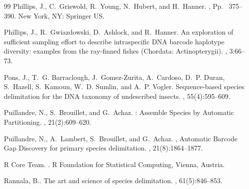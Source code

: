 \documentclass[12pt]{article}
\begin{document}
\begin{thebibliography}{99}
Phillips, J., C.~Griswold, R.~Young, N.~Hubert, and
  H.~Hanner\leavevmode\nopagebreak{}.
, Pp.~ 375--390.
\newblock New York, NY: Springer US.

Phillips, J., R.~Gwiazdowski, D.~Ashlock, and
  R.~Hanner\leavevmode\nopagebreak{}.
\newblock An exploration of sufficient sampling effort to describe
  intraspecific {DNA} barcode haplotype diversity: examples from the ray-finned
  fishes ({C}hordata: {A}ctinopterygii).
, 3:66--73.

Pons, J., T.~G. Barraclough, J.~Gomez-Zurita, A.~Cardoso, D.~P. Duran,
  S.~Hazell, S.~Kamoun, W.~D. Sumlin, and A.~P.
  Vogler\leavevmode\nopagebreak{}.
\newblock Sequence-based species delimitation for the {DNA} taxonomy of
  undescribed insects.
, 55(4):595--609.

Puillandre, N., S.~Brouillet, and G.~Achaz\leavevmode\nopagebreak{}.
: {A}ssemble {S}pecies by {A}utomatic {P}artitioning.
, 21(2):609--620.

Puillandre, N., A.~Lambert, S.~Brouillet, and
  G.~Achaz\leavevmode\nopagebreak{}.
, {A}utomatic {B}arcode {G}ap {D}iscovery for primary species
  delimitation.
, 21(8):1864--1877.

{R Core Team}\leavevmode\nopagebreak{}.
.
\newblock R Foundation for Statistical Computing, Vienna, Austria.

Rannala, B.\leavevmode\nopagebreak{}.
\newblock The art and science of species delimitation.
, 61(5):846--853.


\end{thebibliography}
\end{document}

